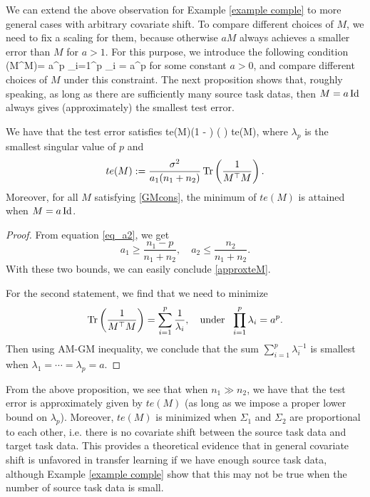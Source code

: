 We can extend the above observation for Example \ref{example comple} to more general cases with arbitrary covariate shift. To compare different choices of $M$, we need to fix a scaling for them, because otherwise $aM$ always achieves a smaller error than $M$ for $a>1$. For this purpose, we introduce the following condition
\be\label{GMcons}\det(M^\top M)= a^p \Leftrightarrow \prod_{i=1}^p \lambda_i = a^p\ee
for some constant $a>0$, and compare different choices of $M$ under this constraint. The next proposition shows that, roughly speaking, as long as there are sufficiently many source task datas, then $M=a\operatorname{Id}$ always gives (approximately) the smallest test error.
\begin{proposition}
We have that the test error satisfies
\be\label{approxteM}  te(M)\left(1 -   \right)  \le  {}\tr\left( \right) \le te(M),\ee
where $\lambda_p$ is the smallest singular value of $p$ and
$$te(M):= \frac{\sigma^2}{a_1(n_1+n_2)}\operatorname{Tr}\left( \frac{1}{M^\top M}\right) .$$
Moreover, for all $M$ satisfying \eqref{GMcons}, the minimum of $te(M)$ is attained when $M= a\operatorname{Id}$.
\end{proposition}
\begin{proof}
From equation \eqref{eq_a2}, we get
$$a_1\ge \frac{n_1-p}{n_1+n_2},\quad a_2\le \frac{n_2}{n_1+n_2}.$$
With these two bounds, we can easily conclude \eqref{approxteM}.

For the second statement, we find that we need to minimize
$$\tr\left( \frac{1}{M^\top M}\right) = \sum_{i=1}^p\frac{1}{\lambda_i},\quad \text{under}\ \ \prod_{i=1}^p\lambda_i=a^p.$$
Then using AM-GM inequality, we conclude that the sum $\sum_{i=1}^p\lambda_i^{-1}$ is smallest when $\lambda_1=\cdots=\lambda_p = a$.
\end{proof}

From the above proposition, we see that when $n_1\gg n_2$, we have that the test error is approximately given by $te(M)$ (as long as we impose a proper lower bound on $\lambda_p$). Moreover, $te(M)$ is minimized when $\Sigma_1$ and $\Sigma_2$ are proportional to each other, i.e. there is no covariate shift between the source task data and target task data. This provides a theoretical evidence that in general covariate shift is unfavored in transfer learning if we have enough source task data, although Example \ref{example comple} show that this may not be true when the number of source task data is small.





